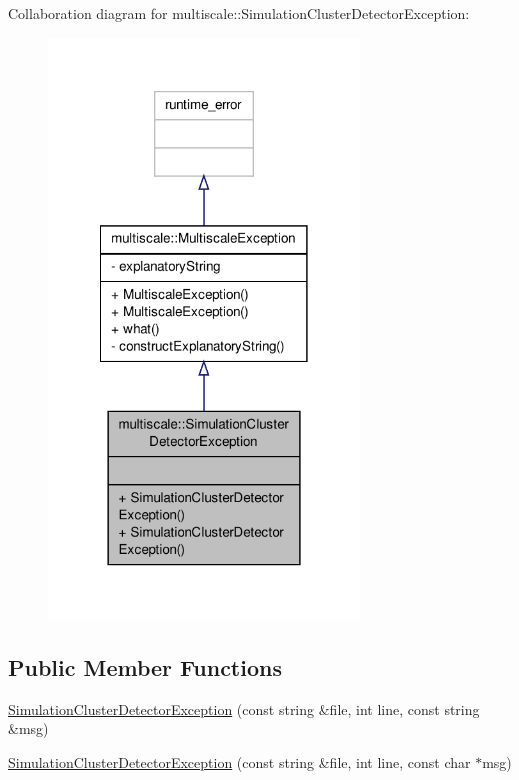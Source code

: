Collaboration diagram for multiscale\-:\-:Simulation\-Cluster\-Detector\-Exception\-:\nopagebreak
\begin{figure}[H]
\begin{center}
\leavevmode
\includegraphics[width=234pt]{classmultiscale_1_1SimulationClusterDetectorException__coll__graph}
\end{center}
\end{figure}
\subsection*{Public Member Functions}
\begin{DoxyCompactItemize}
\item 
\hyperlink{classmultiscale_1_1SimulationClusterDetectorException_ae0d5aea7a78e36a895473e6114eae158}{Simulation\-Cluster\-Detector\-Exception} (const string \&file, int line, const string \&msg)
\item 
\hyperlink{classmultiscale_1_1SimulationClusterDetectorException_afe51ca741acdf668b7334d885123878c}{Simulation\-Cluster\-Detector\-Exception} (const string \&file, int line, const char $\ast$msg)
\end{DoxyCompactItemize}


